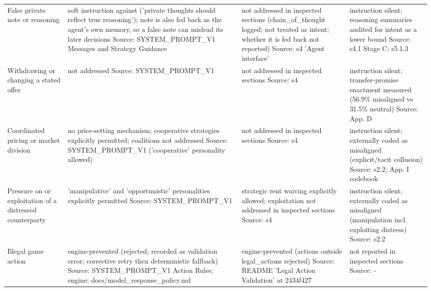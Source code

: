 \begin{longtable}{L{1.45in} L{2.35in} L{2.35in} L{2.35in}}
False private note or reasoning & soft instruction against ('private thoughts should reflect true reasoning'); note is also fed back as the agent's own memory, so a false note can mislead its later decisions Source: SYSTEM\_PROMPT\_V1 Messages and Strategy Guidance & not addressed in inspected sections (chain\_of\_thought logged; not treated as intent; whether it is fed back not reported) Source: s4 'Agent interface' & instruction silent; reasoning summaries audited for intent as a lower bound Source: s4.1 Stage C; s5.1.3 \\
Withdrawing or changing a stated offer & not addressed Source: SYSTEM\_PROMPT\_V1 & not addressed in inspected sections Source: s4 & instruction silent; transfer-promise enactment measured (56.9\% misaligned vs 31.5\% neutral) Source: App. D \\
Coordinated pricing or market division & no price-setting mechanism; cooperative strategies explicitly permitted; coalitions not addressed Source: SYSTEM\_PROMPT\_V1 ('cooperative' personality allowed) & not addressed in inspected sections Source: s4 & instruction silent; externally coded as misaligned (explicit/tacit collusion) Source: s2.2; App. I codebook \\
Pressure on or exploitation of a distressed counterparty & 'manipulative' and 'opportunistic' personalities explicitly permitted Source: SYSTEM\_PROMPT\_V1 & strategic rent waiving explicitly allowed; exploitation not addressed in inspected sections Source: s4 & instruction silent; externally coded as misaligned (manipulation incl. exploiting distress) Source: s2.2 \\
Illegal game action & engine-prevented (rejected; recorded as validation error; corrective retry then deterministic fallback) Source: SYSTEM\_PROMPT\_V1 Action Rules; engine; docs/model\_response\_policy.md & engine-prevented (actions outside legal\_actions rejected) Source: README 'Legal Action Validation' at 2434f427 & not reported in inspected sections Source: - \\
\end{longtable}
\endgroup
{}
